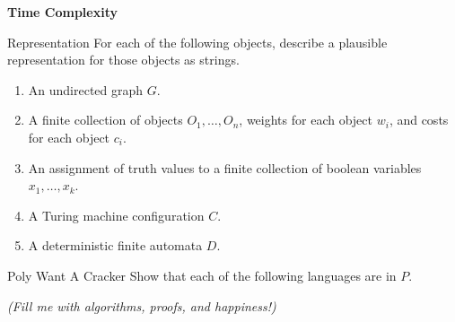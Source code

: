 \documentclass[11pt]{book}
\newcommand{\doctitle}{Time Complexity}
\begin{document}
\begin{center}
  \large\textbf{{\doctitle}}
\end{center}

\vspace{2em}


\newcommand{\desc}[1]{\ensuremath{\langle #1 \rangle}}


\begin{problem}{Representation}
  For each of the following objects, describe a plausible representation for those objects as strings.
  \begin{enumerate}
    \item An undirected graph \( G \).
    \item A finite collection of objects \( O_1, \ldots, O_n \), weights for each object \( w_i \), and costs for each object \( c_i \).
    \item An assignment of truth values to a finite collection of boolean variables \( x_1, \ldots, x_k \).
    \item A Turing machine configuration \( C \).
    \item A deterministic finite automata \( D \).
  \end{enumerate}
\end{problem}

\vspace{2in}

\begin{problem}{Poly Want A Cracker}
  Show that each of the following languages are in \( P \).
\end{problem}

\newpage

\vspace*{\fill}
\emph{(Fill me with algorithms, proofs, and happiness!)}
\end{document}
